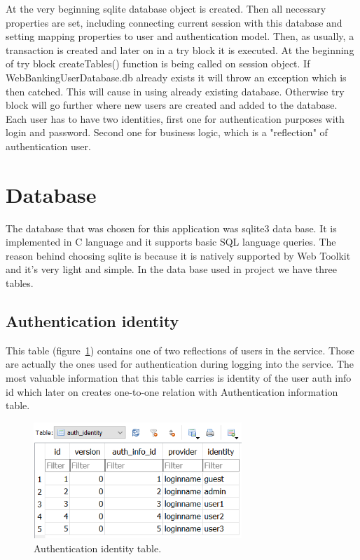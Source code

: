 \documentclass[a4paper,12pt]{book}
\begin{document}
\bigskip
At the very beginning sqlite database object is created. Then all necessary properties are set, including connecting current session with this database and setting mapping properties to user and authentication model. Then, as usually, a transaction is created and later on in a try block it is executed. At the beginning of try block createTables() function is being called on session object. If WebBankingUserDatabase.db already exists it will throw an exception which is then catched. This will cause in using already existing database. Otherwise try block will go further where new users are created and added to the database. Each user has to have two identities, first one for authentication purposes with login and password. Second one for business logic, which is a "reflection" of authentication user. 


\section{Database}
The database that was chosen for this application was sqlite3 data base. It is implemented in C language and it supports basic SQL language queries. The reason behind choosing sqlite is because it is natively supported by Web Toolkit and it's very light and simple. In the data base used in project we have three tables.

\subsection*{Authentication identity}
{
This table (figure~\ref{fig:firsttable}) contains one of two reflections of users in the service. Those are actually the ones used for authentication during logging into the service. The most valuable information that this table carries is identity of the user auth info id which later on creates one-to-one relation with Authentication information table.

\begin{figure}[H]
\centering
\includegraphics[width=0.7\textwidth]{auth_identity}
\caption{Authentication identity table.}
\label{fig:firsttable}
\end{figure}

}
\end{document}

